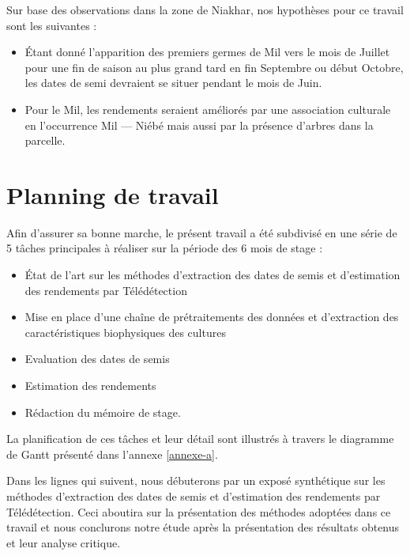 \vspace{5mm} %

Sur base des observations dans la zone de Niakhar, nos hypothèses pour ce travail sont les suivantes :
  \begin{itemize}
   \item \'Etant donné l'apparition des premiers germes de Mil vers le mois de Juillet pour une fin de saison au 
   plus grand tard en fin Septembre ou début Octobre, les dates de semi devraient se situer pendant le mois de Juin. 
   \item Pour le Mil, les rendements seraient améliorés par une association culturale en l'occurrence Mil --- Niébé mais aussi par la présence d'arbres dans la parcelle.
  \end{itemize}

\section{Planning de travail}
Afin d'assurer sa bonne marche, le présent travail a été subdivisé en une série de 5 tâches principales à réaliser sur la période des 6 mois de stage :
  \begin{itemize}
   \item \'Etat de l'art sur les méthodes d'extraction des dates de semis et d'estimation des rendements par Télédétection
   \item Mise en place d'une chaîne de prétraitements des données et d'extraction des caractéristiques biophysiques des cultures
   \item Evaluation des dates de semis
   \item Estimation des rendements
   \item Rédaction du mémoire de stage.
  \end{itemize}
La planification de ces tâches et leur détail sont illustrés \`a travers le diagramme de Gantt présenté dans l'annexe \ref{annexe-a}.

\vspace{5mm} %

Dans les lignes qui suivent, nous débuterons par un exposé synthétique sur les méthodes d'extraction des dates de semis et d'estimation des rendements par Télédétection. 
Ceci aboutira sur la présentation des méthodes adoptées dans ce travail et nous conclurons notre étude après la présentation des résultats obtenus et leur analyse critique.
